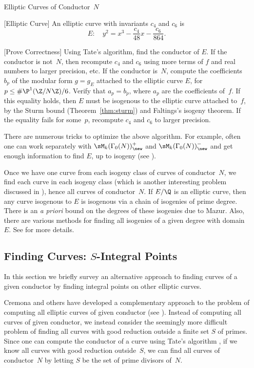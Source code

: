 \begin{algorithm}{Elliptic Curves of Conductor~$N$}
\begin{steps}
\begin{steps}
\item{}[Elliptic Curve] An elliptic curve with
invariants $c_4$ and $c_6$ is 
$$
E: \quad y^2 = x^3 -\frac{c_4}{48}x  -\frac{c_6}{864}.
$$

\item{}[Prove Correctness]\label{step:correct}  
Using Tate's algorithm, find
the conductor of $E$. If the conductor is not~$N$, then recompute $c_4$ and
$c_6$ using more terms of $f$ and real numbers
 to larger precision, etc.  If the conductor is~$N$, 
compute the coefficients $b_p$ of the modular form $g=g_E$
attached to the elliptic curve $E$, for $p\leq \#\P^1(\Z/N\Z)/6$.
Verify that $a_p = b_p$, where $a_p$ are the coefficients
of~$f$.   If this equality holds, then $E$ must be isogenous
to the elliptic curve attached to~$f$, by the Sturm
bound (Theorem~\ref{thm:sturm}) and Faltings's isogeny theorem.
If the equality fails for some~$p$, recompute $c_4$ and $c_6$
to larger precision.
\end{steps}
\end{steps}
\end{algorithm}
There are numerous tricks to optimize the above algorithm.
For example, often one can work separately with
 $\sM_k(\Gamma_0(N))_{\new}^+$
and 
$\sM_k(\Gamma_0(N))_{\new}^-$ and
get enough information to find $E$, up to isogeny
(see \cite{cremona:periods}).


Once we have one curve from each isogeny class of curves of
conductor~$N$, we find each curve in each isogeny class (which is
another interesting problem discussed in \cite{cremona:algs}), hence
all curves of conductor~$N$.  If $E/\Q$ is an elliptic curve, then any
curve isogenous to $E$ is isogenous via a chain of isogenies of prime
degree.  There is an {\em a priori} bound on the degrees of these
isogenies due to Mazur.  Also, there are various methods for finding
all isogenies of a given degree with domain $E$.   See
\cite[\S3.8]{cremona:algs} for more details.



\subsection{Finding Curves: $S$-Integral Points}
In this section we briefly survey an alternative approach to
finding curves of a given conductor by finding integral points on
other elliptic curves.

Cremona and others have developed a complementary
approach to the problem of computing all elliptic curves of given
conductor (see \cite{cremona-lingham}).  Instead of computing all
curves of given conductor, we instead consider the seemingly more
difficult problem of finding all curves with good reduction outside a
finite set $S$ of primes.  Since one can compute the conductor of a
curve using Tate's algorithm \cite[\S3.2]{tate:antwerpiv,
  cremona:algs}, if we know all curves with good reduction
outside~$S$, we can find all curves of conductor~$N$ by letting $S$ be
the set of prime divisors of~$N$.

